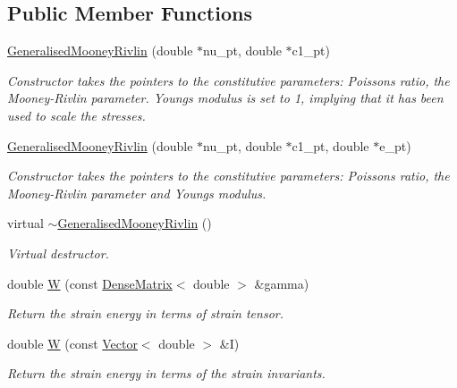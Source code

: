 \subsection*{Public Member Functions}
\begin{DoxyCompactItemize}
\item 
\hyperlink{classoomph_1_1GeneralisedMooneyRivlin_a04bdac757114843e1b758b64a552c23b}{Generalised\+Mooney\+Rivlin} (double $\ast$nu\+\_\+pt, double $\ast$c1\+\_\+pt)
\begin{DoxyCompactList}\small\item\em Constructor takes the pointers to the constitutive parameters\+: Poisson\textquotesingle{}s ratio, the Mooney-\/\+Rivlin parameter. Young\textquotesingle{}s modulus is set to 1, implying that it has been used to scale the stresses. \end{DoxyCompactList}\item 
\hyperlink{classoomph_1_1GeneralisedMooneyRivlin_a4c709851b0ed6e9a975d69c1b2146429}{Generalised\+Mooney\+Rivlin} (double $\ast$nu\+\_\+pt, double $\ast$c1\+\_\+pt, double $\ast$e\+\_\+pt)
\begin{DoxyCompactList}\small\item\em Constructor takes the pointers to the constitutive parameters\+: Poisson\textquotesingle{}s ratio, the Mooney-\/\+Rivlin parameter and Young\textquotesingle{}s modulus. \end{DoxyCompactList}\item 
virtual \hyperlink{classoomph_1_1GeneralisedMooneyRivlin_a855599e1cbdfbb9eb5aad3c5931e4f03}{$\sim$\+Generalised\+Mooney\+Rivlin} ()
\begin{DoxyCompactList}\small\item\em Virtual destructor. \end{DoxyCompactList}\item 
double \hyperlink{classoomph_1_1GeneralisedMooneyRivlin_a91ff4fa7c19304c98f9a0017c22747a9}{W} (const \hyperlink{classoomph_1_1DenseMatrix}{Dense\+Matrix}$<$ double $>$ \&gamma)
\begin{DoxyCompactList}\small\item\em Return the strain energy in terms of strain tensor. \end{DoxyCompactList}\item 
double \hyperlink{classoomph_1_1GeneralisedMooneyRivlin_a2edff387e97632febd90938b27a30a14}{W} (const \hyperlink{classoomph_1_1Vector}{Vector}$<$ double $>$ \&I)
\begin{DoxyCompactList}\small\item\em Return the strain energy in terms of the strain invariants. \end{DoxyCompactList}\item 

\end{DoxyCompactItemize}
